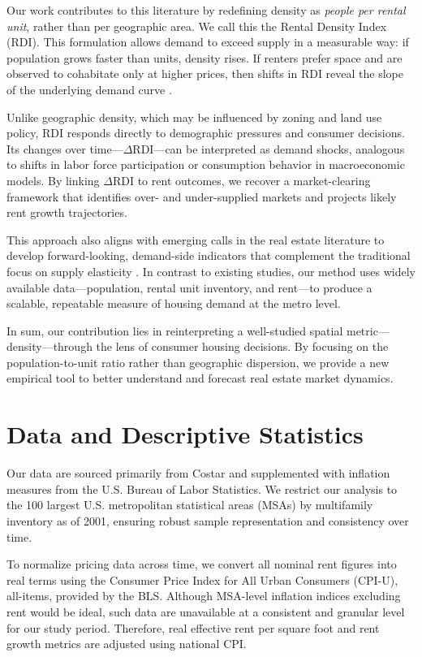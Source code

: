 \documentclass[sn-mathphys-num]{sn-jnl}%
\theoremstyle{thmstyleone}%
\theoremstyle{thmstyletwo}%
\theoremstyle{thmstylethree}%
\begin{document}
Our work contributes to this literature by redefining density as \textit{people per rental unit}, rather than per geographic area. We call this the Rental Density Index (RDI). This formulation allows demand to exceed supply in a measurable way: if population grows faster than units, density rises. If renters prefer space and are observed to cohabitate only at higher prices, then shifts in RDI reveal the slope of the underlying demand curve \citep{muth1969cities, molloy2022housing}.

Unlike geographic density, which may be influenced by zoning and land use policy, RDI responds directly to demographic pressures and consumer decisions. Its changes over time---\( \Delta \text{RDI} \)---can be interpreted as demand shocks, analogous to shifts in labor force participation or consumption behavior in macroeconomic models. By linking \( \Delta \text{RDI} \) to rent outcomes, we recover a market-clearing framework that identifies over- and under-supplied markets and projects likely rent growth trajectories.

This approach also aligns with emerging calls in the real estate literature to develop forward-looking, demand-side indicators that complement the traditional focus on supply elasticity \citep{glaeser2019rethinking}. In contrast to existing studies, our method uses widely available data---population, rental unit inventory, and rent---to produce a scalable, repeatable measure of housing demand at the metro level.

In sum, our contribution lies in reinterpreting a well-studied spatial metric---density---through the lens of consumer housing decisions. By focusing on the population-to-unit ratio rather than geographic dispersion, we provide a new empirical tool to better understand and forecast real estate market dynamics.

\section{Data and Descriptive Statistics}

Our data are sourced primarily from Costar and supplemented with inflation measures from the U.S. Bureau of Labor Statistics. We restrict our analysis to the 100 largest U.S. metropolitan statistical areas (MSAs) by multifamily inventory as of 2001, ensuring robust sample representation and consistency over time.

To normalize pricing data across time, we convert all nominal rent figures into real terms using the Consumer Price Index for All Urban Consumers (CPI-U), all-items, provided by the BLS. Although MSA-level inflation indices excluding rent would be ideal, such data are unavailable at a consistent and granular level for our study period. Therefore, real effective rent per square foot and rent growth metrics are adjusted using national CPI.
\end{document}
